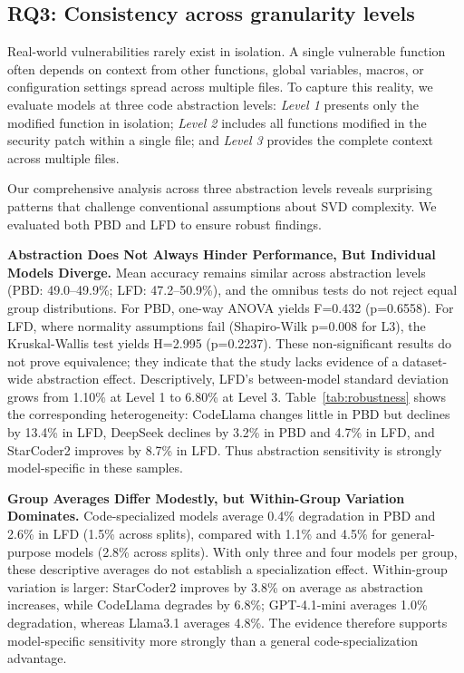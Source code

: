 \documentclass[lettersize,journal]{IEEEtran}
\begin{document}
\subsection{RQ3: Consistency across granularity levels}
\label{section:rq3}

Real-world vulnerabilities rarely exist in isolation. A single vulnerable function often depends on context from other functions, global variables, macros, or configuration settings spread across multiple files. To capture this reality, we evaluate models at three code abstraction levels: \textit{Level 1} presents only the modified function in isolation; \textit{Level 2} includes all functions modified in the security patch within a single file; and \textit{Level 3} provides the complete context across multiple files.

Our comprehensive analysis across three abstraction levels reveals surprising patterns that challenge conventional assumptions about \gls{SVD} complexity. We evaluated both PBD and LFD to ensure robust findings.

\textbf{Abstraction Does Not Always Hinder Performance, But Individual Models Diverge.} Mean accuracy remains similar across abstraction levels (PBD: 49.0--49.9\%; LFD: 47.2--50.9\%), and the omnibus tests do not reject equal group distributions. For PBD, one-way ANOVA yields F=0.432 (p=0.6558). For LFD, where normality assumptions fail (Shapiro-Wilk p=0.008 for L3), the Kruskal-Wallis test yields H=2.995 (p=0.2237). These non-significant results do not prove equivalence; they indicate that the study lacks evidence of a dataset-wide abstraction effect. Descriptively, LFD's between-model standard deviation grows from 1.10\% at Level 1 to 6.80\% at Level 3. Table~\ref{tab:robustness} shows the corresponding heterogeneity: CodeLlama changes little in PBD but declines by 13.4\% in LFD, DeepSeek declines by 3.2\% in PBD and 4.7\% in LFD, and StarCoder2 improves by 8.7\% in LFD. Thus abstraction sensitivity is strongly model-specific in these samples.

\textbf{Group Averages Differ Modestly, but Within-Group Variation Dominates.} Code-specialized models average 0.4\% degradation in PBD and 2.6\% in LFD (1.5\% across splits), compared with 1.1\% and 4.5\% for general-purpose models (2.8\% across splits). With only three and four models per group, these descriptive averages do not establish a specialization effect. Within-group variation is larger: StarCoder2 improves by 3.8\% on average as abstraction increases, while CodeLlama degrades by 6.8\%; GPT-4.1-mini averages 1.0\% degradation, whereas Llama3.1 averages 4.8\%. The evidence therefore supports model-specific sensitivity more strongly than a general code-specialization advantage.
\end{document}
